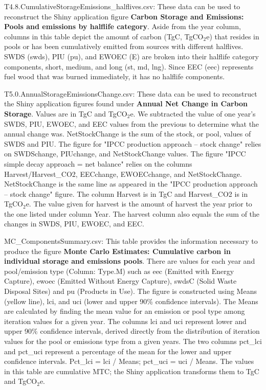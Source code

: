 \documentclass[
  openany]{book}
\begin{document}
T4.8.CumulativeStorageEmissions\_halflives.csv: These data can be used to reconstruct the Shiny application figure \textbf{Carbon Storage and Emissions: Pools and emissions by halflife category}. Aside from the year column, columns in this table depict the amount of carbon (TgC, TgCO\(_2\)e) that resides in pools or has been cumulatively emitted from sources with different halflives. SWDS (swds), PIU (pu), and EWOEC (E) are broken into their halflife category components, short, medium, and long (st, md, lng). Since EEC (eec) represents fuel wood that was burned immediately, it has no halflife components.

T5.0.AnnualStorageEmissionsChange.csv: These data can be used to reconstruct the Shiny application figures found under \textbf{Annual Net Change in Carbon Storage}. Values are in TgC and TgCO\(_2\)e. We subtracted the value of one year's SWDS, PIU, EWOEC, and EEC values from the previous to determine what the annual change was. NetStockChange is the sum of the stock, or pool, values of SWDS and PIU. The figure for "IPCC production approach -- stock change" relies on SWDSchange, PIUchange, and NetStockChange values. The figure "IPCC simple decay approach = net balance" relies on the columns Harvest/Harvest\_CO2, EECchange, EWOECchange, and NetStockChange. NetStockChange is the same line as appeared in the "IPCC production approach -- stock change" figure. The column Harvest is in TgC and Harvest\_CO2 is in TgCO\(_2\)e. The value given for harvest is the amount of harvest the year prior to the one listed under column Year. The harvest column also equals the sum of the changes in SWDS, PIU, EWOEC, and EEC.

MC\_ComponentsSummary.csv: This table provides the information necessary to produce the figure \textbf{Monte Carlo Estimates: Cumulative carbon in individual storage and emissions pools}. There are values for each year and pool/emission type (Column: Type.M) such as eec (Emitted with Energy Capture), ewoec (Emitted Without Energy Capture), swdsC (Solid Waste Disposal Sites) and pu (Products in Use). The figure is constructed using Means (yellow line), lci, and uci (lower and upper 90\% confidence intervals). The Means are calculated by finding the mean value for an emission or pool type among iteration values for a given year. The columns lci and uci represent lower and upper 90\% confidence intervals, derived directly from the distribution of iteration values for the pool or emissions type from a given years. The two columns pct\_lci and pct\_uci represent a percentage of the mean for the lower and upper confidence intervals. Pct\_lci = lci / Means; pct\_uci = uci / Means. The values in this table are cumulative MTC; the Shiny application transforms them to TgC and TgCO\(_2\)e.
\end{document}
